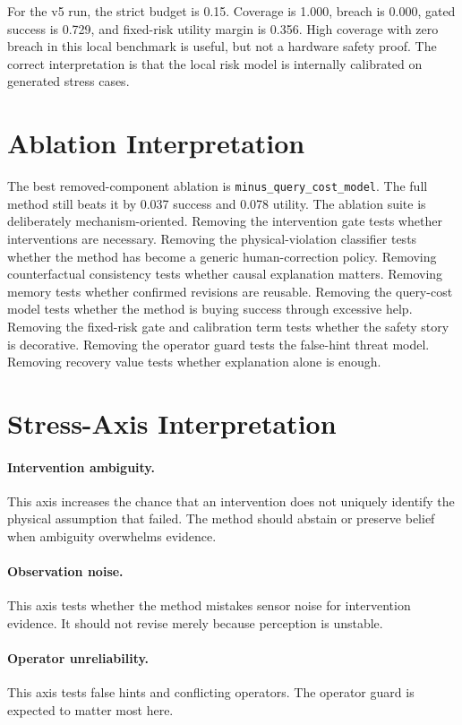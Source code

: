 \documentclass{article}
\begin{document}
For the v5 run, the strict budget is 0.15. Coverage is 1.000, breach is 0.000, gated success is 0.729, and fixed-risk utility margin is 0.356. High coverage with zero breach in this local benchmark is useful, but not a hardware safety proof. The correct interpretation is that the local risk model is internally calibrated on generated stress cases.

\section{Ablation Interpretation}
The best removed-component ablation is \texttt{minus\_query\_cost\_model}. The full method still beats it by 0.037 success and 0.078 utility. The ablation suite is deliberately mechanism-oriented. Removing the intervention gate tests whether interventions are necessary. Removing the physical-violation classifier tests whether the method has become a generic human-correction policy. Removing counterfactual consistency tests whether causal explanation matters. Removing memory tests whether confirmed revisions are reusable. Removing the query-cost model tests whether the method is buying success through excessive help. Removing the fixed-risk gate and calibration term tests whether the safety story is decorative. Removing the operator guard tests the false-hint threat model. Removing recovery value tests whether explanation alone is enough.

\clearpage
\section{Stress-Axis Interpretation}
\paragraph{Intervention ambiguity.} This axis increases the chance that an intervention does not uniquely identify the physical assumption that failed. The method should abstain or preserve belief when ambiguity overwhelms evidence.

\paragraph{Observation noise.} This axis tests whether the method mistakes sensor noise for intervention evidence. It should not revise merely because perception is unstable.

\paragraph{Operator unreliability.} This axis tests false hints and conflicting operators. The operator guard is expected to matter most here.
\end{document}
